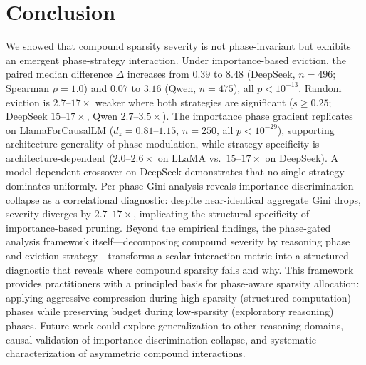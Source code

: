 \section{Conclusion}
\label{sec:conclusion}

We showed that compound sparsity severity is not phase-invariant but exhibits an emergent phase-strategy interaction. Under importance-based eviction, the paired median difference $\Delta$ increases from $0.39$ to $8.48$ (DeepSeek, $n{=}496$; Spearman $\rho{=}1.0$) and $0.07$ to $3.16$ (Qwen, $n{=}475$), all $p < 10^{-13}$. Random eviction is $2.7$--$17{\times}$ weaker where both strategies are significant ($s \geq 0.25$; DeepSeek $15$--$17{\times}$, Qwen $2.7$--$3.5{\times}$). The importance phase gradient replicates on LlamaForCausalLM ($d_z{=}0.81$--$1.15$, $n{=}250$, all $p < 10^{-29}$), supporting architecture-generality of phase modulation, while strategy specificity is architecture-dependent ($2.0$--$2.6{\times}$ on LLaMA vs.\ $15$--$17{\times}$ on DeepSeek). A model-dependent crossover on DeepSeek demonstrates that no single strategy dominates uniformly. Per-phase Gini analysis reveals importance discrimination collapse as a correlational diagnostic: despite near-identical aggregate Gini drops, severity diverges by $2.7$--$17{\times}$, implicating the structural specificity of importance-based pruning.
Beyond the empirical findings, the phase-gated analysis framework itself---decomposing compound severity by reasoning phase and eviction strategy---transforms a scalar interaction metric into a structured diagnostic that reveals where compound sparsity fails and why. This framework provides practitioners with a principled basis for phase-aware sparsity allocation: applying aggressive compression during high-sparsity (structured computation) phases while preserving budget during low-sparsity (exploratory reasoning) phases. Future work could explore generalization to other reasoning domains, causal validation of importance discrimination collapse, and systematic characterization of asymmetric compound interactions.
